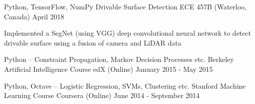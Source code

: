 \vspace{-1.0mm}
\vspace{-2mm}
\begin{center}
  \cventry
    {Python, TensorFlow, NumPy}
    {Drivable Surface Detection}
    {ECE 457B (Waterloo, Canada)}
    {April 2018}
    {
      \begin{cvitems}
        \item {Implemented a SegNet (using VGG) deep convolutional neural network to detect drivable surface using a fusion of camera and LiDAR data}
      \end{cvitems}
    }
\end{center}
\begin{center}
  \vspace{-3.0mm}
  \cventry
    {Python – Constraint Propagation, Markov Decision Processes etc.}
    {Berkeley Artificial Intelligence Course}
    {edX (Online)}
    {January 2015 - May 2015}
    {}
\end{center}
\begin{center}
  \vspace{-6.0mm}
  \cventry
    {Python, Octave – Logistic Regression, SVMs, Clustering etc.}
    {Stanford Machine Learning Course}
    {Coursera (Online)}
    {June 2014 - September 2014}
    {}
\end{center}

